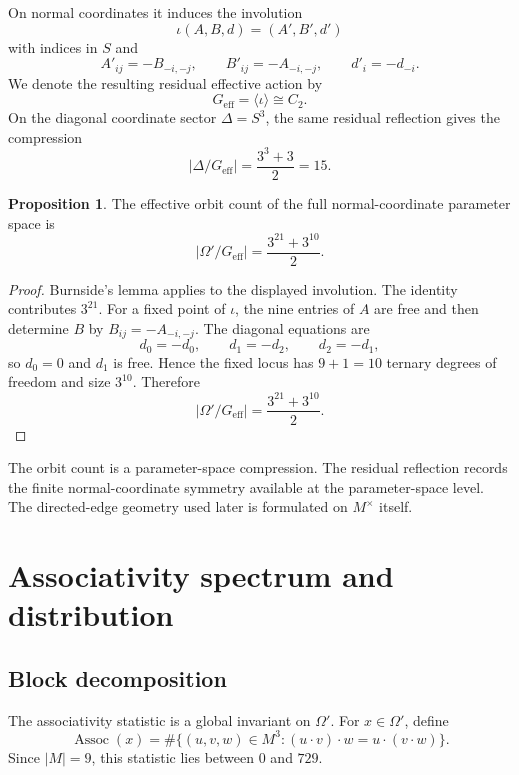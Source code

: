 \documentclass[11pt]{article}
\theoremstyle{definition}
\newtheorem{proposition}[theorem]{Proposition}
\begin{document}
On normal coordinates it induces the involution
\[
\iota(A,B,d)=(A',B',d')
\]
with indices in \(S\) and
\[
A'_{ij}=-B_{-i,-j},
\qquad
B'_{ij}=-A_{-i,-j},
\qquad
d'_i=-d_{-i}.
\]
We denote the resulting residual effective action by
\[
G_{\mathrm{eff}}=\langle\iota\rangle\cong C_2.
\]
On the diagonal coordinate sector \(\Delta=S^3\), the same residual
reflection gives the compression
\[
|\Delta/G_{\mathrm{eff}}|=\frac{3^3+3}{2}=15.
\]

\begin{proposition}
\label{prop:2.1}
The effective orbit count of the full
normal-coordinate parameter space is
\[
|\Omega'/G_{\mathrm{eff}}|=\frac{3^{21}+3^{10}}2.
\]
\end{proposition}

\begin{proof}
Burnside's lemma applies to the displayed involution.  The identity
contributes \(3^{21}\).  For a fixed point of \(\iota\), the nine entries
of \(A\) are free and then determine \(B\) by
\(B_{ij}=-A_{-i,-j}\).  The diagonal equations are
\[
d_0=-d_0,
\qquad
d_1=-d_2,
\qquad
d_2=-d_1,
\]
so \(d_0=0\) and \(d_1\) is free.  Hence the fixed locus has
\(9+1=10\) ternary degrees of freedom and size \(3^{10}\).  Therefore
\[
|\Omega'/G_{\mathrm{eff}}|=
\frac{3^{21}+3^{10}}2.
\]
\end{proof}

The orbit count is a parameter-space compression.  The residual reflection records
the finite normal-coordinate symmetry available at the parameter-space level.  The
directed-edge geometry used later is formulated on \(M^\times\) itself.


\section{Associativity spectrum and distribution}\label{associativity-spectrum-distribution}\label{associativity-master-formula}

\subsection{Block decomposition}\label{assoc-block-decomposition}\label{the-associativity-statistic}

The associativity statistic is a global invariant on \(\Omega'\).  For \(x\in\Omega'\), define \[
\operatorname{Assoc}(x)=
\#\{(u,v,w)\in M^3:(u\cdot v)\cdot w=u\cdot(v\cdot w)\}.
\] Since \(|M|=9\), this statistic lies between \(0\) and \(729\).
\end{document}
